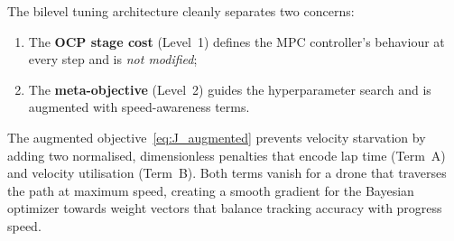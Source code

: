 The bilevel tuning architecture cleanly separates two concerns:
%
\begin{enumerate}
  \item The \textbf{OCP stage cost} (Level~1) defines the
    MPC controller's behaviour at every step and is
    \emph{not modified};
  \item The \textbf{meta-objective} (Level~2) guides
    the hyperparameter search and is augmented with
    speed-awareness terms.
\end{enumerate}
%
The augmented objective~\eqref{eq:J_augmented} prevents velocity
starvation by adding two normalised, dimensionless penalties
that encode lap time (Term~A) and velocity utilisation (Term~B).
Both terms vanish for a drone that traverses the path at maximum
speed, creating a smooth gradient for the Bayesian optimizer
towards weight vectors that balance tracking accuracy with
progress speed.
